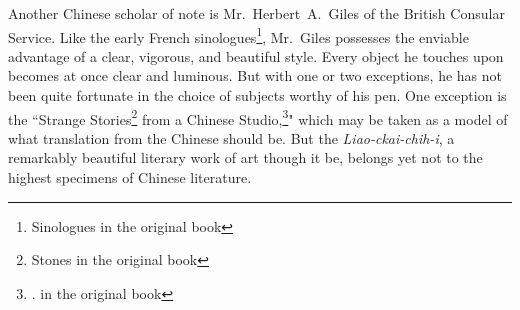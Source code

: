 Another Chinese scholar of note is Mr.~Herbert~A.~Giles  of the British Consular Service.
Like the early French sinologues\footnote{Sinologues in the original book}, Mr.~Giles possesses the enviable advantage of a clear, vigorous, and beautiful style.
Every object he touches upon becomes at once clear and luminous.
But with one or two exceptions, he has not  been quite fortunate in the choice of subjects worthy of his pen.
One exception is the ``Strange Stories\footnote{Stones in the original book} from a Chinese Studio,\footnote{. in the original book}" which may be taken as a model of what translation from the Chinese should be.
But the \emph{Liao-ckai-chih-i}, a remarkably beautiful literary work of art though it be, belongs yet not to the highest specimens of Chinese literature.

